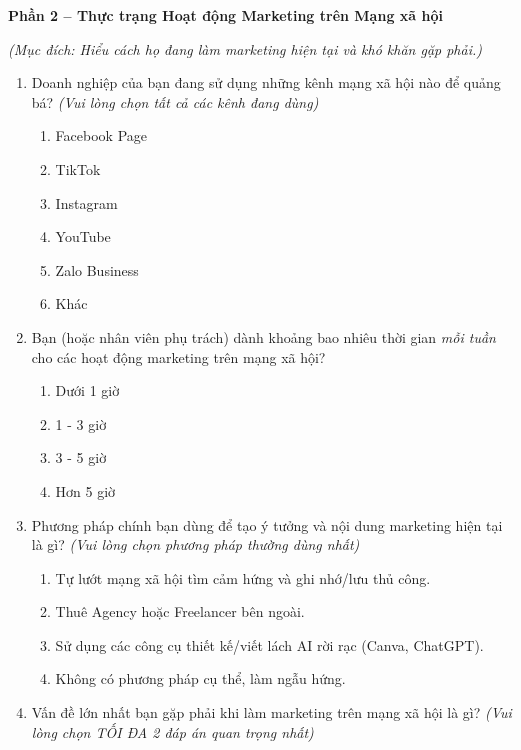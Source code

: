 \textbf{Phần 2 -- Thực trạng Hoạt động Marketing trên Mạng xã hội}

\emph{(Mục đích: Hiểu cách họ đang làm marketing hiện tại và khó khăn
gặp phải.)}

\begin{enumerate}
\def\labelenumi{\arabic{enumi}.}
\setcounter{enumi}{4}
\item
  Doanh nghiệp của bạn đang sử dụng những kênh mạng xã hội nào để quảng
  bá? \emph{(Vui lòng chọn tất cả các kênh đang dùng)}

  \begin{enumerate}
  \def\labelenumii{\arabic{enumii}.}
  \item
    Facebook Page
  \item
    TikTok
  \item
    Instagram
  \item
    YouTube
  \item
    Zalo Business
  \item
    Khác
  \end{enumerate}
\item
  Bạn (hoặc nhân viên phụ trách) dành khoảng bao nhiêu thời gian
  \emph{mỗi tuần} cho các hoạt động marketing trên mạng xã hội?

  \begin{enumerate}
  \def\labelenumii{\arabic{enumii}.}
  \item
    Dưới 1 giờ
  \item
    1 - 3 giờ
  \item
    3 - 5 giờ
  \item
    Hơn 5 giờ
  \end{enumerate}
\item
  Phương pháp chính bạn dùng để tạo ý tưởng và nội dung marketing hiện
  tại là gì? \emph{(Vui lòng chọn phương pháp thường dùng nhất)}

  \begin{enumerate}
  \def\labelenumii{\arabic{enumii}.}
  \item
    Tự lướt mạng xã hội tìm cảm hứng và ghi nhớ/lưu thủ công.
  \item
    Thuê Agency hoặc Freelancer bên ngoài.
  \item
    Sử dụng các công cụ thiết kế/viết lách AI rời rạc (Canva, ChatGPT).
  \item
    Không có phương pháp cụ thể, làm ngẫu hứng.
  \end{enumerate}
\item
  Vấn đề lớn nhất bạn gặp phải khi làm marketing trên mạng xã hội là gì?
  \emph{(Vui lòng chọn TỐI ĐA 2 đáp án quan trọng nhất)}


\end{enumerate}
